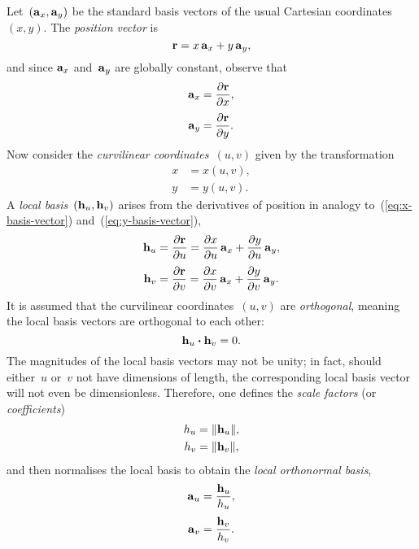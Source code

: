 Let~$(\mathop{}\!\boldsymbol{\mathrm{a}}_{x}, \mathop{}\!\boldsymbol{\mathrm{a}}_{y})$ be the standard basis vectors
of the usual Cartesian coordinates~$(x, y)$.
The \emph{position vector} is
\begin{equation}
  \boldsymbol{\mathrm{r}} = x \mathop{}\!\boldsymbol{\mathrm{a}}_{x} + y \mathop{}\!\boldsymbol{\mathrm{a}}_{y},
  \label{eq:position-vector-cartesian}
\end{equation}
and since $\mathop{}\!\boldsymbol{\mathrm{a}}_{x}$ and~$\mathop{}\!\boldsymbol{\mathrm{a}}_{y}$ are globally constant,
observe that
\begin{align}
  \basisvec{x} &= \pder{\vec{r}}{x},
    \label{eq:x-basis-vector} \\[\fraclinespace]
  \basisvec{y} &= \pder{\vec{r}}{y}.
    \label{eq:y-basis-vector}
\end{align}
Now consider the \emph{curvilinear coordinates}~$(u, v)$
given by the transformation
\begin{align}
  x &= x (u, v), \label{eq:curvilinear-x-transformation} \\
  y &= y (u, v). \label{eq:curvilinear-y-transformation}
\end{align}
A \emph{local basis}~$(\mathop{}\!\boldsymbol{\mathrm{h}}_{u}, \mathop{}\!\boldsymbol{\mathrm{h}}_{v})$
arises from the derivatives of position
in analogy to~(\ref{eq:x-basis-vector}) and~(\ref{eq:y-basis-vector}),
\begin{align}
  \localvec{u} &
    = \pder{\vec{r}}{u}
    = \pder{x}{u} \basisvec{x} + \pder{y}{u} \basisvec{y},
      \label{eq:u-local-basis-vector} \\[\fraclinespace]
  \localvec{v} &
    = \pder{\vec{r}}{v}
    = \pder{x}{v} \basisvec{x} + \pder{y}{v} \basisvec{y}.
      \label{eq:v-local-basis-vector}
\end{align}
It is assumed that the curvilinear coordinates~$(u, v)$ are \emph{orthogonal},
meaning the local basis vectors are orthogonal to each other:
\begin{equation}
  \mathop{}\!\boldsymbol{\mathrm{h}}_{u} \boldsymbol{\cdot} \mathop{}\!\boldsymbol{\mathrm{h}}_{v} = 0.
  \label{eq:local-basis-orthogonal}
\end{equation}
The magnitudes of the local basis vectors may not be unity;
in fact, should either~$u$ or~$v$ not have dimensions of length,
the corresponding local basis vector will not even be dimensionless.
Therefore, one defines the \emph{scale factors}
(or \emph{\lame{} coefficients})
\begin{align}
  h_{u} &= \lVert\mathop{}\!\boldsymbol{\mathrm{h}}_{u}\rVert, \label{eq:u-scale-factor} \\
  h_{v} &= \lVert\mathop{}\!\boldsymbol{\mathrm{h}}_{v}\rVert, \label{eq:v-scale-factor}
\end{align}
and then normalises the local basis
to obtain the \emph{local orthonormal basis},
\begin{align}
  \basisvec{u} &= \frac{\localvec{u}}{\scalefac{u}},
      \label{eq:u-basis-vector} \\[\fraclinespace]
  \basisvec{v} &= \frac{\localvec{v}}{\scalefac{v}}.
      \label{eq:v-basis-vector}
\end{align}

